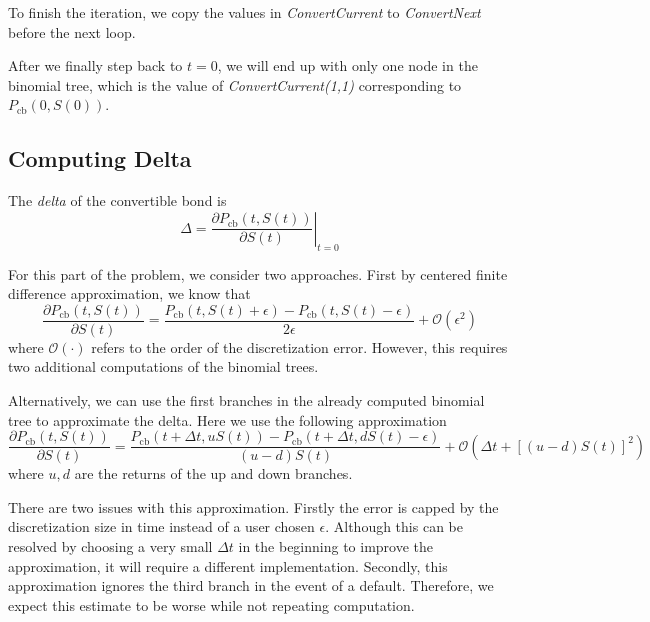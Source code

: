 \documentclass[11pt]{article}
\theoremstyle{definition}
\begin{document}
To finish the iteration, we copy the values in 
\emph{ConvertCurrent} to \emph{ConvertNext} 
before the next loop.

After we finally step back to $t=0$,
we will end up with only one node in the 
binomial tree,
which is the value of \emph{ConvertCurrent(1,1)}
corresponding to $P_\text{cb}(0,S(0))$.








\subsection{Computing Delta}

The \emph{delta} of the convertible bond is 
%
\begin{equation*}
  \Delta = \left. \frac{\partial P_\text{cb}(t,S(t)) }{\partial S(t)}
  \right|_{t=0}
\end{equation*}

For this part of the problem, we consider two approaches. 
First by centered finite difference approximation, 
we know that
%
\begin{equation} \label{cfd}
  \frac{\partial P_\text{cb}(t,S(t)) }{\partial S(t)}
  = \frac{P_\text{cb}(t,S(t) + \epsilon) - 
          P_\text{cb}(t,S(t)-\epsilon)}{2\epsilon}
    + \mathcal{O}(\epsilon ^ 2)
\end{equation}
%
where $\mathcal{O}(\cdot)$ refers to the order of 
the discretization error.
However, this requires two additional computations 
of the binomial trees.

Alternatively, we can use the first branches 
in the already computed binomial tree
to approximate the delta. 
Here we use the following approximation
%
\begin{equation} \label{bino_cfd}
  \frac{\partial P_\text{cb}(t,S(t)) }{\partial S(t)}
  = \frac{P_\text{cb}(t + \Delta t, u S(t) ) - 
        P_\text{cb}(t + \Delta t, d S(t)-\epsilon)}{
        (u-d)S(t)}
    + \mathcal{O}\left(\Delta t + [(u-d)S(t)]^2\right)
\end{equation}
%
where $u,d$ are the returns of the up and down branches.

There are two issues with this approximation.
Firstly the error is capped by the discretization size in time
instead of a user chosen $\epsilon$.
Although this can be resolved by choosing a very small 
$\Delta t$ in the beginning to improve the approximation,
it will require a different implementation.
Secondly, this approximation ignores the third branch 
in the event of a default.
Therefore, we expect this estimate to be worse
while not repeating computation.
\end{document}
